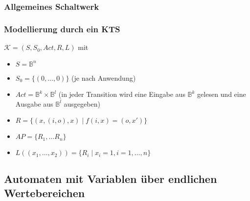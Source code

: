 \subsubsection*{Allgemeines Schaltwerk}

\subsubsection*{Modellierung durch ein KTS}
$\mathcal{K} = (S, S_0, \textit{Act}, R, L)$ mit
\begin{itemize}
	\item $S = \mathbb{B}^n$
	\item $S_0 = \{(0, \dots, 0)\}$ (je nach Anwendung)
	\item $\textit{Act} = \mathbb{B}^k \times \mathbb{B}^l$ (in jeder Transition wird eine Eingabe aus $\mathbb{B}^k$ gelesen und eine Ausgabe aus $\mathbb{B}^l$ ausgegeben)
	\item $R = \{(x, (i,o), x) \mid f(i,x) = (o, x')\}$
	\item $AP = \{R_1, \dots R_n\}$
	\item $L\left((x_1,\dots,x_2)\right) = \{R_i \mid x_i = 1, i=1,\dots,n\}$
\end{itemize}

\nextlecture
\subsection{Automaten mit Variablen über endlichen Wertebereichen}

\cleardoubleoddemptypage
